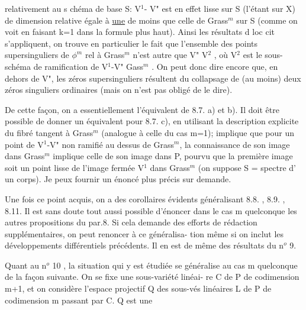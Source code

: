
relativement  au s chéma de base S:  V$^1$- V"  est en effet lisse sur S
(l'étant sur X)  de dimension relative égale à \uline{une} de moins que celle de
Grass$^m$ sur S  (comme on voit en faisant k=1 dans la formule plus haut).
Ainsi  les résultats d  loc cit  s'appliquent, on trouve en particulier
le fait que l'ensemble des points  supersinguliers  de $\phi^m$ rel à Grass$^m$
n'est autre que V" \hand{$\cup$} V$^2$ , où  V$^2$ est le sous-schéma de ramification
de  V$^1$-V" \hand{$\longrightarrow$} Gass$^m$ .  On peut donc dire encore que, en dehors de V", les
zéros supersinguliers résultent du collapsage de (au moins) deux zéros
singuliers ordinaires (mais on  n'est pas obligé de le dire\hand{)}).

\margin{$|$} De cette façon, on a essentiellement l'équivalent de 8.7. a) et b). Il \margin{$+$}
doit être possible de donner un équivalent pour  8.7. c), en  utilisant
la  description explicite du fibré tangent  à Grass$^m$ (analogue à
celle du cas m=1);   implique  que  pour  un point  de  V$^1$-V"  non
ramifié au dessus  de Grass$^m$, la connaissance de son image dans Grass$^m$
implique celle de son image dans P, pourvu que la première image soit un
point lisse de l'image fermée  V$^1$ dans Grass$^m$  (on suppose S = spectre d'
un corps).  Je peux fournir un énoncé  plus précis sur demande.

Une fois ce point acquis,  on a des corollaires évidents généralisant
8.8. , 8.9. , 8.11.   Il est sans doute tout aussi possible d'énoncer dans
le cas m quelconque  les autres propositions du par.8. Si cela demande des
efforts de rédaction  supplémentaires, on peut renoncer à ce généralisa-%
tion\hand{,}  même si on inclut les développements différentiels précédents.
Il en est de même des résultats du n$^o$ 9.

Quant au n$^o$ 10 ,  la situation qui y est étudiée se généralise au
cas m quelconque de la façon suivante. On se fixe une sous-variété linéai-
re C de P  de codimension m+1, et on considère l'espace projectif Q des
sous-vés linéaires L de P de codimension m passant par C. Q est une

